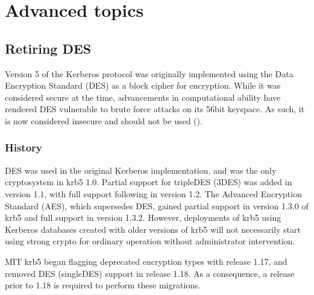 \documentclass[letterpaper,10pt,english]{sphinxmanual}
\begin{document}
\chapter{Advanced topics}
\label{\detokenize{admin/advanced/index:advanced-topics}}\label{\detokenize{admin/advanced/index::doc}}

\section{Retiring DES}
\label{\detokenize{admin/advanced/retiring-des:retiring-des}}\label{\detokenize{admin/advanced/retiring-des:id1}}\label{\detokenize{admin/advanced/retiring-des::doc}}
\sphinxAtStartPar
Version 5 of the Kerberos protocol was originally implemented using
the Data Encryption Standard (DES) as a block cipher for encryption.
While it was considered secure at the time, advancements in computational
ability have rendered DES vulnerable to brute force attacks on its 56\sphinxhyphen{}bit
keyspace.  As such, it is now considered insecure and should not be
used ().


\subsection{History}
\label{\detokenize{admin/advanced/retiring-des:history}}
\sphinxAtStartPar
DES was used in the original Kerberos implementation, and was the
only cryptosystem in krb5 1.0.  Partial support for triple\sphinxhyphen{}DES (3DES) was
added in version 1.1, with full support following in version 1.2.
The Advanced Encryption Standard (AES), which supersedes DES, gained
partial support in version 1.3.0 of krb5 and full support in version 1.3.2.
However, deployments of krb5 using Kerberos databases created with older
versions of krb5 will not necessarily start using strong crypto for
ordinary operation without administrator intervention.

\sphinxAtStartPar
MIT krb5 began flagging deprecated encryption types with release 1.17,
and removed DES (single\sphinxhyphen{}DES) support in release 1.18.  As a
consequence, a release prior to 1.18 is required to perform these
migrations.
\end{document}
